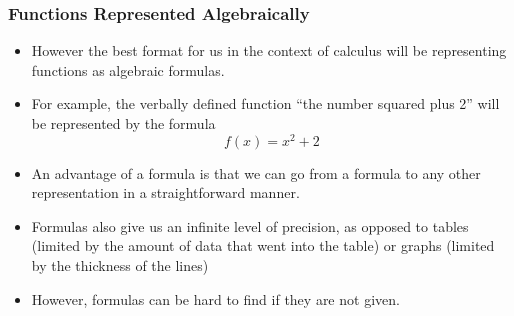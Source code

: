 \documentclass[serif,ignorenonframetext]{beamer}
\begin{document}
\begin{frame}
  \frametitle{Functions Represented Algebraically}
  \begin{itemize}[<+->]
  \item However the best format for us in the context of calculus will
    be representing functions as algebraic formulas.
  \item For example, the verbally defined function ``the number
    squared plus 2'' will be represented by the formula
    \begin{equation*}
      f(x)= x^2 + 2
    \end{equation*}
  \item An advantage of a formula is that we can go from a formula to
    any other representation in a straightforward manner.
  \item Formulas also give us an infinite level of precision, as
    opposed to tables (limited by the amount of data that went into
    the table) or graphs (limited by the thickness of the lines)
  \item However, formulas can be hard to find if they are not given.
  \end{itemize}
\end{frame}
\end{document}
